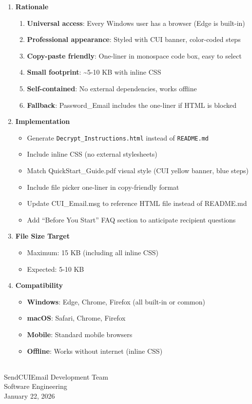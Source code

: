 \documentclass[11pt,letterpaper]{article}
\newcommand{\DocumentDate}{January 22, 2026}
\newcommand{\AuthorName}{SendCUIEmail Development Team}
\newcommand{\AuthorTitle}{Software Engineering}
\newcommand{\dmsection}[1]{\item \textbf{#1}\par}
\begin{document}
\begin{enumerate}
\dmsection{Rationale}

\begin{enumerate}[label=\alph*.]
    \item \textbf{Universal access}: Every Windows user has a browser (Edge is built-in)
    \item \textbf{Professional appearance}: Styled with CUI banner, color-coded steps
    \item \textbf{Copy-paste friendly}: One-liner in monospace code box, easy to select
    \item \textbf{Small footprint}: \textasciitilde5-10 KB with inline CSS
    \item \textbf{Self-contained}: No external dependencies, works offline
    \item \textbf{Fallback}: Password\_Email includes the one-liner if HTML is blocked
\end{enumerate}

\dmsection{Implementation}

\begin{itemize}
    \item Generate \texttt{Decrypt\_Instructions.html} instead of \texttt{README.md}
    \item Include inline CSS (no external stylesheets)
    \item Match QuickStart\_Guide.pdf visual style (CUI yellow banner, blue steps)
    \item Include file picker one-liner in copy-friendly format
    \item Update CUI\_Email.msg to reference HTML file instead of README.md
    \item Add ``Before You Start'' FAQ section to anticipate recipient questions
\end{itemize}

\dmsection{File Size Target}

\begin{itemize}
    \item Maximum: 15 KB (including all inline CSS)
    \item Expected: 5-10 KB
\end{itemize}

\dmsection{Compatibility}

\begin{itemize}
    \item \textbf{Windows}: Edge, Chrome, Firefox (all built-in or common)
    \item \textbf{macOS}: Safari, Chrome, Firefox
    \item \textbf{Mobile}: Standard mobile browsers
    \item \textbf{Offline}: Works without internet (inline CSS)
\end{itemize}

\end{enumerate}

\vspace{0.5in}

\underline{\hspace{2.5in}}\\[2pt]
\AuthorName\\
\AuthorTitle\\
\DocumentDate
\end{document}
